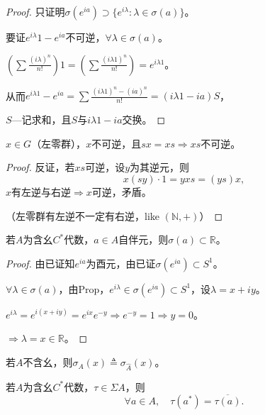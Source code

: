 \documentclass[lang=cn,a4paper,newtx,section]{elegantbook}
\begin{document}
\begin{proof}
  只证明$\sigma(e^{ia}) \supset \{e^{i\lambda} : \lambda \in \sigma(a)\}$。
  
  要证$e^{i\lambda}1 - e^{ia}$不可逆，$\forall \lambda \in \sigma(a)$。
  
  $\left(\sum\frac{(i\lambda)^n}{n!}\right)1 = \left(\sum\frac{(i\lambda 1)^n}{n!}\right) = e^{i\lambda 1}$。
  
  从而$e^{i\lambda 1} - e^{ia} = \sum\frac{(i\lambda 1)^n - (ia)^n}{n!} = (i\lambda 1 - ia)S$，
  
  $S$—记求和，且$S$与$i\lambda 1 - ia$交换。
\end{proof}

\begin{proposition}
  $x \in G$（左零群），$x$不可逆，且$sx = xs \Rightarrow xs$不可逆。
\end{proposition}

\begin{proof}
  反证，若$xs$可逆，设$y$为其逆元，则
  \begin{equation*}
    x(sy) \cdot 1 = yxs = (ys)x,
  \end{equation*}
  $x$有左逆与右逆$\Rightarrow x$可逆，矛盾。
  
  （左零群有左逆不一定有右逆，like $(\mathbb{N}, +)$）
\end{proof}

\begin{lemma}
  若$A$为含幺$C^*$代数，$a \in A$自伴元，则$\sigma(a) \subset \mathbb{R}$。
\end{lemma}

\begin{proof}
  由已证知$e^{ia}$为酉元，由已证$\sigma(e^{ia}) \subset S^1$。
  
  $\forall \lambda \in \sigma(a)$，由Prop，$e^{i\lambda} \in \sigma(e^{ia}) \subset S^1$，设$\lambda = x + iy$。
  
  $e^{i\lambda} = e^{i(x + iy)} = e^{ix}e^{-y} \Rightarrow e^{-y} = 1 \Rightarrow y = 0$。
  
  $\Rightarrow \lambda = x \in \mathbb{R}$。
\end{proof}

\begin{remark}
  若$A$不含幺，则$\sigma_A(x) \triangleq \sigma_{\hat{A}}(x)$。
\end{remark}

\begin{lemma}
  若$A$为含幺$C^*$代数，$\tau \in \Sigma A$，则
  \begin{equation*}
    \forall a \in A, \quad \tau(a^*) = \overline{\tau(a)}.
  \end{equation*}
\end{lemma}
\end{document}
